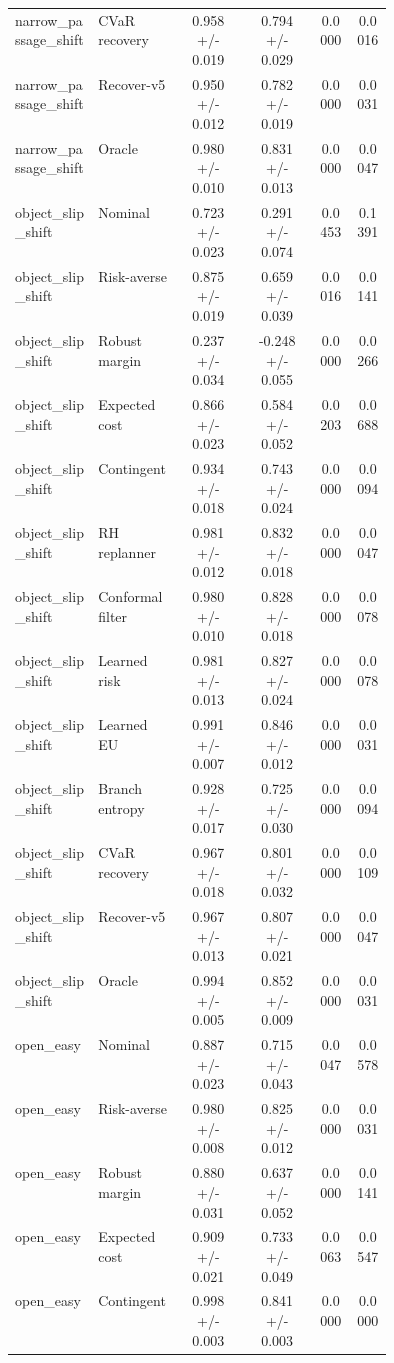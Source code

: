 \documentclass{article}
\begin{document}
\begin{center}
\begin{longtable}{p{0.22\linewidth}p{0.22\linewidth}cccc}
narrow\_passage\_shift & CVaR recovery & 0.958 +/- 0.019 & 0.794 +/- 0.029 & 0.0000 & 0.0016\\
narrow\_passage\_shift & Recover-v5 & 0.950 +/- 0.012 & 0.782 +/- 0.019 & 0.0000 & 0.0031\\
narrow\_passage\_shift & Oracle & 0.980 +/- 0.010 & 0.831 +/- 0.013 & 0.0000 & 0.0047\\
object\_slip\_shift & Nominal & 0.723 +/- 0.023 & 0.291 +/- 0.074 & 0.0453 & 0.1391\\
object\_slip\_shift & Risk-averse & 0.875 +/- 0.019 & 0.659 +/- 0.039 & 0.0016 & 0.0141\\
object\_slip\_shift & Robust margin & 0.237 +/- 0.034 & -0.248 +/- 0.055 & 0.0000 & 0.0266\\
object\_slip\_shift & Expected cost & 0.866 +/- 0.023 & 0.584 +/- 0.052 & 0.0203 & 0.0688\\
object\_slip\_shift & Contingent & 0.934 +/- 0.018 & 0.743 +/- 0.024 & 0.0000 & 0.0094\\
object\_slip\_shift & RH replanner & 0.981 +/- 0.012 & 0.832 +/- 0.018 & 0.0000 & 0.0047\\
object\_slip\_shift & Conformal filter & 0.980 +/- 0.010 & 0.828 +/- 0.018 & 0.0000 & 0.0078\\
object\_slip\_shift & Learned risk & 0.981 +/- 0.013 & 0.827 +/- 0.024 & 0.0000 & 0.0078\\
object\_slip\_shift & Learned EU & 0.991 +/- 0.007 & 0.846 +/- 0.012 & 0.0000 & 0.0031\\
object\_slip\_shift & Branch entropy & 0.928 +/- 0.017 & 0.725 +/- 0.030 & 0.0000 & 0.0094\\
object\_slip\_shift & CVaR recovery & 0.967 +/- 0.018 & 0.801 +/- 0.032 & 0.0000 & 0.0109\\
object\_slip\_shift & Recover-v5 & 0.967 +/- 0.013 & 0.807 +/- 0.021 & 0.0000 & 0.0047\\
object\_slip\_shift & Oracle & 0.994 +/- 0.005 & 0.852 +/- 0.009 & 0.0000 & 0.0031\\
open\_easy & Nominal & 0.887 +/- 0.023 & 0.715 +/- 0.043 & 0.0047 & 0.0578\\
open\_easy & Risk-averse & 0.980 +/- 0.008 & 0.825 +/- 0.012 & 0.0000 & 0.0031\\
open\_easy & Robust margin & 0.880 +/- 0.031 & 0.637 +/- 0.052 & 0.0000 & 0.0141\\
open\_easy & Expected cost & 0.909 +/- 0.021 & 0.733 +/- 0.049 & 0.0063 & 0.0547\\
open\_easy & Contingent & 0.998 +/- 0.003 & 0.841 +/- 0.003 & 0.0000 & 0.0000\\

\end{longtable}
\end{center}
\end{document}
